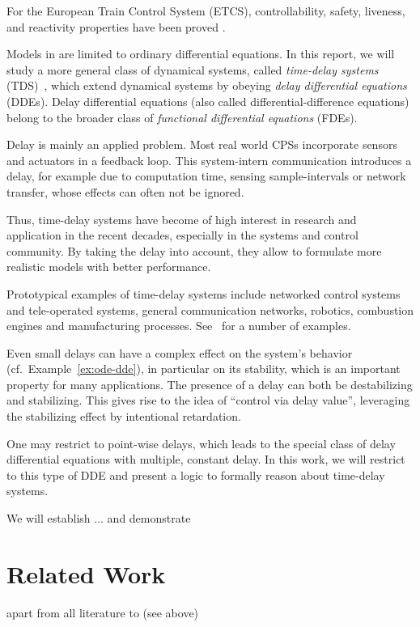     For the European Train Control System (ETCS), controllability, safety, liveness, and reactivity properties have been proved \cite{Platzer09ETCS}.

    

    Models in \dL are limited to ordinary differential equations.
    In this report, we will study a more general class of dynamical systems, called \emph{time-delay systems} (TDS)~\cite{Richard2003TDSs}, which extend dynamical systems by obeying \emph{delay differential equations} (DDEs). Delay differential equations (also called differential-difference equations) belong to the broader class of \emph{functional differential equations} (FDEs).

    Delay is mainly an applied problem. Most real world CPSs incorporate
    sensors and actuators in a feedback loop. This system-intern communication introduces a delay, for example due to computation time, sensing sample-intervals or network transfer, whose effects can often not be ignored.

    Thus, time-delay systems have become of high interest in research and application in the recent decades, especially in the systems and control community. By taking the delay into account, they allow to formulate more realistic models with better performance.
    
    Prototypical examples of time-delay systems include networked control systems and tele-operated systems, general communication networks, robotics, combustion engines and manufacturing processes. See~\cite{Gu03TimeDelaySys} for a number of examples.

    Even small delays can have a complex effect on the system's behavior (cf.\ Example~\ref{ex:ode-dde}), in particular on its stability, which is an important property for many applications.
    The presence of a delay can both be destabilizing and stabilizing.
    This gives rise to the idea of ``control via delay value'', leveraging the stabilizing effect by intentional retardation.
    


    One may restrict to point-wise delays, which leads to the special class of delay differential equations with multiple, constant delay.
    In this work, we will restrict to this type of DDE and present a logic to formally reason about time-delay systems.

    We will establish ...
    and demonstrate


    \section{Related Work}
        apart from all literature to \dL (see above)
        \cite{Huang16BoundedVerificationNNDS}
